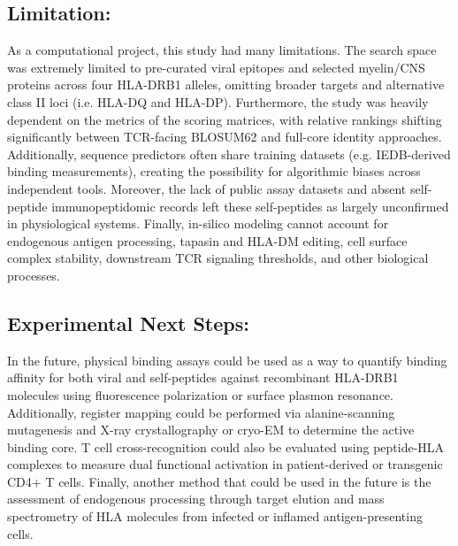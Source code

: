 \documentclass[11pt]{article}
\begin{document}
\subsection{Limitation:}
As a computational project, this study had many limitations. The search space was extremely limited to pre-curated viral epitopes and selected myelin/CNS proteins across four HLA-DRB1 alleles, omitting broader targets and alternative class II loci (i.e. HLA-DQ and HLA-DP). Furthermore, the study was heavily dependent on the metrics of the scoring matrices, with relative rankings shifting significantly between TCR-facing BLOSUM62 and full-core identity approaches. Additionally, sequence predictors often share training datasets (e.g. IEDB-derived binding measurements), creating the possibility for algorithmic biases across independent tools. Moreover, the lack of public assay datasets and absent self-peptide immunopeptidomic records left these self-peptides as largely unconfirmed in physiological systems. Finally, in-silico modeling cannot account for endogenous antigen processing, tapasin and HLA-DM editing, cell surface complex stability, downstream TCR signaling thresholds, and other biological processes.

\subsection{Experimental Next Steps:}
In the future, physical binding assays could be used as a way to quantify binding affinity for both viral and self-peptides against recombinant HLA-DRB1 molecules using fluorescence polarization or surface plasmon resonance. Additionally, register mapping could be performed via alanine-scanning mutagenesis and X-ray crystallography or cryo-EM to determine the active binding core. T cell cross-recognition could also be evaluated using peptide-HLA complexes to measure dual functional activation in patient-derived or transgenic CD4+ T cells. Finally, another method that could be used in the future is the assessment of endogenous processing through target elution and mass spectrometry of HLA molecules from infected or inflamed antigen-presenting cells.
\FloatBarrier
\end{document}
